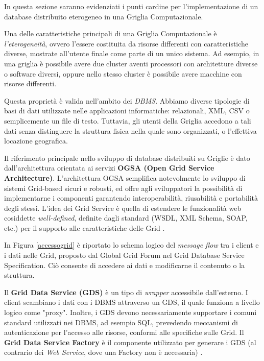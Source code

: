 \documentclass[11pt]{article}
\begin{document}
In questa sezione saranno evidenziati i punti cardine per l'implementazione di un database distribuito eterogeneo in una Griglia Computazionale.

Una delle caratteristiche principali di una Griglia Computazionale è \emph{l'eterogeneità}, ovvero l'essere costituita da risorse differenti con caratteristiche diverse, mostrate all'utente finale come parte di un unico sistema. Ad esempio, in una griglia è possibile avere due cluster aventi processori con architetture diverse o software diversi, oppure nello stesso cluster è possibile avere macchine con risorse differenti.

Questa proprietà è valida nell'ambito dei \emph{DBMS}. Abbiamo diverse tipologie di basi di dati utilizzate nelle applicazioni informatiche: relazionali, XML, CSV o semplicemente un file di testo. Tuttavia, gli utenti della Griglia accedono a tali dati senza distinguere la struttura fisica nella quale sono organizzati, o l'effettiva locazione geografica.

Il riferimento principale nello sviluppo di database distribuiti su Griglie è dato dall'architettura orientata ai servizi \textbf{OGSA (Open Grid Service Architecture)}. L'architettura OGSA semplifica notevolmente lo sviluppo di sistemi Grid-based sicuri e robusti, ed offre agli sviluppatori la possibilità di implementarne i componenti garantendo interoperabilità, riusabilità e portabilità degli stessi. L'idea dei Grid Service è quella di estendere le funzionalità web cosiddette \emph{well-defined}, definite dagli standard (WSDL, XML Schema, SOAP, etc.) per il supporto alle caratteristiche delle Grid \cite{2} \cite{3}. 

In Figura \ref{accessogrid} è riportato lo schema logico del \emph{message flow} tra i client e i dati nelle Grid, proposto dal Global Grid Forum nel Grid Database Service Specification. Ciò consente di accedere ai dati e modificarne il contenuto o la struttura. 

Il \textbf{Grid Data Service (GDS)} è un tipo di \emph{wrapper} accessibile dall'esterno. I client scambiano i dati con i DBMS attraverso un GDS, il quale funziona a livello logico come "proxy". Inoltre, i GDS devono necessariamente supportare i comuni standard utilizzati nei DBMS, ad esempio SQL, prevedendo meccanismi di autenticazione per l'accesso alle risorse, conformi alle specifiche sulle Grid. Il \textbf{Grid Data Service Factory} è il componente utilizzato per generare i GDS (al contrario dei \emph{Web Service}, dove una Factory non è necessaria) \cite{3}. 
\end{document}

